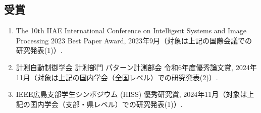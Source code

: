 \documentclass[a4paper,11pt,nomag]{jsreport}
\begin{document}
\subsection*{受賞}
\begin{enumerate}
  \item The 10th IIAE International Conference on Intelligent Systems and Image Processing 2023 Best Paper Award, 2023年9月（対象は上記の国際会議での研究発表(1)）.
  \item 計測自動制御学会 計測部門 パターン計測部会 令和6年度優秀論文賞, 2024年11月（対象は上記の国内学会（全国レベル）での研究発表(2)）.
  \item IEEE広島支部学生シンポジウム (HISS) 優秀研究賞, 2024年11月（対象は上記の国内学会（支部・県レベル）での研究発表(1)）.
\end{enumerate}



\end{document}
